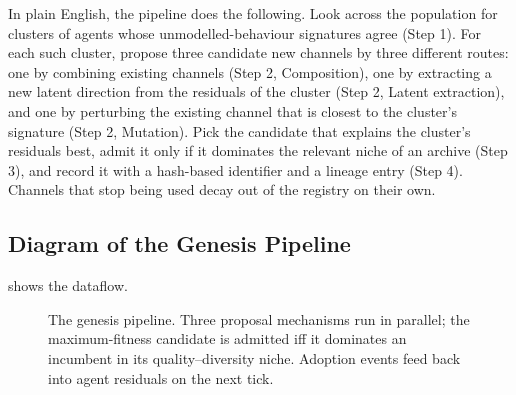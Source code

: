 \documentclass[journal,onecolumn,11pt]{IEEEtran}
\theoremstyle{definition}
\begin{document}
In plain English, the pipeline does the following. Look across the population for clusters of agents whose unmodelled-behaviour signatures agree (Step 1). For each such cluster, propose three candidate new channels by three different routes: one by combining existing channels (Step 2, Composition), one by extracting a new latent direction from the residuals of the cluster (Step 2, Latent extraction), and one by perturbing the existing channel that is closest to the cluster's signature (Step 2, Mutation). Pick the candidate that explains the cluster's residuals best, admit it only if it dominates the relevant niche of an archive (Step 3), and record it with a hash-based identifier and a lineage entry (Step 4). Channels that stop being used decay out of the registry on their own.

\subsection{Diagram of the Genesis Pipeline}

 shows the dataflow.

\begin{figure}[ht]
\centering
{}
\caption{The genesis pipeline. Three proposal mechanisms run in parallel; the maximum-fitness candidate is admitted iff it dominates an incumbent in its quality--diversity niche. Adoption events feed back into agent residuals on the next tick.}
\label{fig:genesis}
\end{figure}
\end{document}
